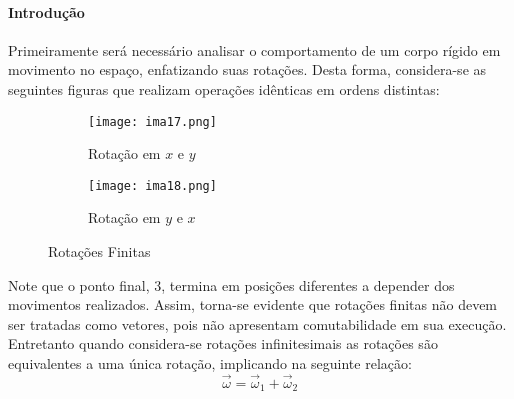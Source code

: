 \documentclass{article}
\begin{document}
            \paragraph{Introdução}Primeiramente será necessário analisar o comportamento de um corpo rígido em movimento no espaço, enfatizando suas rotações. Desta forma, considera-se as seguintes figuras que realizam operações idênticas em ordens distintas:
                \begin{figure}[H]
                    \centering
                    \begin{subfigure}[t]{0.45\textwidth}
                        \centering
                        \texttt{[image: ima17.png]}
                        \caption{Rotação em $x$ e $y$}
                    \end{subfigure}
                    \begin{subfigure}[t]{0.45\textwidth}
                        \centering
                        \texttt{[image: ima18.png]}
                        \caption{Rotação em $y$ e $x$}
                    \end{subfigure}
                    \caption{Rotações Finitas}
                \end{figure}\noindent
            Note que o ponto final, 3, termina em posições diferentes a depender dos movimentos realizados. Assim, torna-se evidente que rotações finitas não devem ser tratadas como vetores, pois não apresentam comutabilidade em sua execução. Entretanto quando considera-se rotações infinitesimais as rotações são equivalentes a uma única rotação, implicando na seguinte relação:
                \begin{equation}
                    \boxed{
                        \vec{\omega} = 
                        \vec{\omega}_{1} + 
                        \vec{\omega}_{2}
                    }
                \end{equation}
\end{document}
